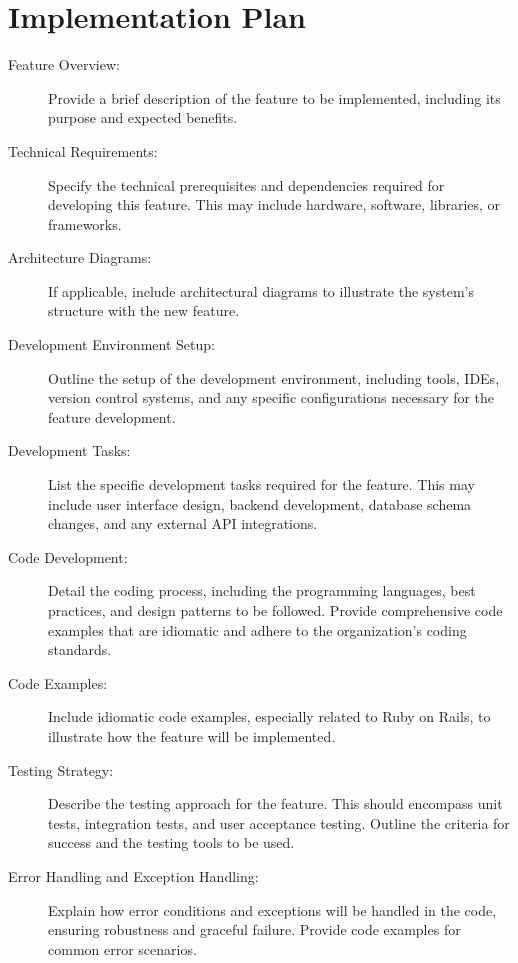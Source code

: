 \documentclass{article}
\begin{document}
\section{Implementation Plan}
\begin{description}
    \item[Feature Overview:]
    Provide a brief description of the feature to be implemented, including its purpose and expected benefits.

    \item[Technical Requirements:]
    Specify the technical prerequisites and dependencies required for developing this feature. This may include hardware, software, libraries, or frameworks.

    \item[Architecture Diagrams:] If applicable, include architectural diagrams to illustrate the system's structure with the new feature.

    \item[Development Environment Setup:]
    Outline the setup of the development environment, including tools, IDEs, version control systems, and any specific configurations necessary for the feature development.

    \item[Development Tasks:]
    List the specific development tasks required for the feature. This may include user interface design, backend development, database schema changes, and any external API integrations.

    \item[Code Development:]
    Detail the coding process, including the programming languages, best practices, and design patterns to be followed. Provide comprehensive code examples that are idiomatic and adhere to the organization's coding standards.
    
    \item[Code Examples:] Include idiomatic code examples, especially related to Ruby on Rails, to illustrate how the feature will be implemented.

    \item[Testing Strategy:]
    Describe the testing approach for the feature. This should encompass unit tests, integration tests, and user acceptance testing. Outline the criteria for success and the testing tools to be used.

    \item[Error Handling and Exception Handling:]
    Explain how error conditions and exceptions will be handled in the code, ensuring robustness and graceful failure. Provide code examples for common error scenarios.


\end{description}
\end{document}
